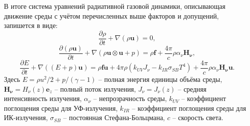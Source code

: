 \documentclass[a4paper,11pt,twoside]{article}
\begin{document}



В итоге система уравнений радиативной газовой динамики, описывающая движение среды с учётом перечисленных выше факторов и допущений, запишется в виде:
\begin{equation}\label{eq_gas_1}
\frac{\partial{\rho}}{\partial{t}} + \nabla{(\rho \mathbf{u})}=0,
\end{equation}
\begin{equation}\label{eq_gas_2}
\frac{\partial{(\rho \mathbf{u})}}{\partial{t}} + \nabla{(\rho \mathbf{u} \otimes \mathbf{u} + p)} = \rho\mathbf{f} + \frac{4\pi}{c}\rho \alpha_{\nu} \mathbf{H_{\nu}},
\end{equation}
\begin{equation}\label{eq_gas_3}
\frac{\partial{E}}{\partial {t}} + \nabla((E + p)\mathbf{u}) = \rho\mathbf{f}\mathbf{u} + 4\pi\rho(k_{UV}J_\nu - k_{IR}\sigma_{SB} T^4) + \frac{4\pi}{c}\rho \alpha_{\nu}\mathbf{H_\nu}\mathbf{u}.
\end{equation}
Здесь $E = \rho u^{2}/2 + p/(\gamma - 1)$ -- полная энергия единицы объёма среды,
$\mathbf{H_{\nu}} = H_{\nu}(z)\mathbf{e}_z$ -- полный поток излучения,
$J_\nu = J_\nu(z)$ -- средняя интенсивность излучения,
$\alpha_\nu$ -- непрозрачность среды,
$k_{UV}$ -- коэффициент поглощения среды для УФ-излучения,
$k_{IR}$ -- коэффициент поглощения среды для ИК-излучения,
$\sigma_{SB}$ -- постоянная Стефана-Больцмана,
$c$ -- скорость света.
\end{document}
